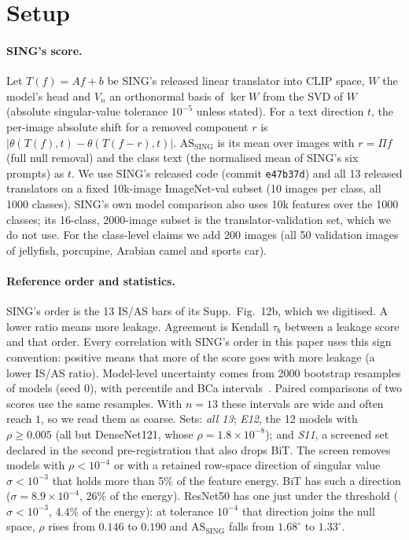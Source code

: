 \documentclass[10pt]{article}
\newcommand{\ASS}{\mathrm{AS}_{\mathrm{SING}}}
\begin{document}
\section{Setup}
\label{sec:setup}
\paragraph{SING's score.}
Let $T(f)=Af+b$ be SING's released linear translator into CLIP space, $W$ the model's head and $V_n$ an orthonormal basis of $\ker W$ from the SVD of $W$ (absolute singular-value tolerance $10^{-5}$ unless stated).
For a text direction $t$, the per-image absolute shift for a removed component $r$ is $|\theta(T(f),t)-\theta(T(f-r),t)|$.
$\ASS$ is its mean over images with $r=\Pi f$ (full null removal) and the class text (the normalised mean of SING's six prompts) as $t$.
We use SING's released code (commit \texttt{e47b37d}) and all 13 released translators on a fixed 10k-image ImageNet-val subset (10 images per class, all 1000 classes).
SING's own model comparison also uses 10k features over the 1000 classes; its 16-class, 2000-image subset is the translator-validation set, which we do not use.
For the class-level claims we add 200 images (all 50 validation images of jellyfish, porcupine, Arabian camel and sports car).

\paragraph{Reference order and statistics.}
SING's order is the 13 IS/AS bars of its Supp.\ Fig.~12b, which we digitised.
A lower ratio means more leakage.
Agreement is Kendall $\tau_b$ between a leakage score and that order.
Every correlation with SING's order in this paper uses this sign convention: positive means that more of the score goes with more leakage (a lower IS/AS ratio).
Model-level uncertainty comes from 2000 bootstrap resamples of models (seed 0), with percentile and BCa intervals~\citep{efron1987bca}.
Paired comparisons of two scores use the same resamples.
With $n{=}13$ these intervals are wide and often reach $1$, so we read them as coarse.
Sets: \emph{all 13}; \emph{E12}, the 12 models with $\rho\ge0.005$ (all but DenseNet121, whose $\rho{=}1.8{\times}10^{-8}$); and \emph{S11}, a screened set declared in the second pre-registration that also drops BiT.
The screen removes models with $\rho<10^{-4}$ or with a retained row-space direction of singular value $\sigma<10^{-3}$ that holds more than 5\% of the feature energy.
BiT has such a direction ($\sigma{=}8.9{\times}10^{-4}$, 26\% of the energy).
ResNet50 has one just under the threshold ($\sigma<10^{-3}$, 4.4\% of the energy): at tolerance $10^{-4}$ that direction joins the null space, $\rho$ rises from $0.146$ to $0.190$ and $\ASS$ falls from $1.68^\circ$ to $1.33^\circ$.
\end{document}
